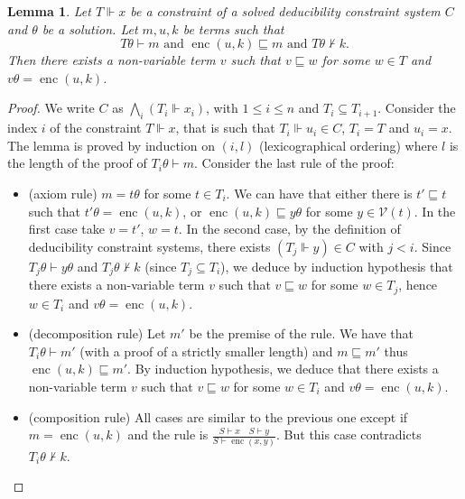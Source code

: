 \documentclass[acmtocl,acmnow]{acmtrans2m}
\newtheorem{lemma}[theorem]{Lemma}
\newcommand{\var}{\mathcal{V}}
\newcommand{\enc}{\operatorname{enc}}
\newcommand{\dedsys}[1]{deducibility constraint system}
\newcommand{\dedsyss}[1]{deducibility constraint systems}
\begin{document}
\begin{lemma}\label{lem:encrypts_deduc}
Let $T\Vdash x$ be a constraint of a solved \dedsys{} $C$ and $\theta$ be a
 solution. Let $m, u, k$ be terms such that
\[
T\theta\vdash m \mbox{ and } \enc(u,k)\sqsubseteq m \mbox{ and }
T\theta\not\vdash k. \]
Then there exists a non-variable term $v$ such that  $v\sqsubseteq w$ for some $w\in T$
and $v\theta = \enc(u,k)$.
\end{lemma}
\begin{proof}
We write $C$ as $\bigwedge_i(T_i\Vdash x_i)$, with $1\le i\le n$ and $T_i\subseteq T_{i+1}$.
Consider the index $i$ of the constraint $T\Vdash x$, that is such that $T_i\Vdash u_i\in C$, $T_i=T$ and
$u_i=x$. The lemma is proved by induction on $(i,l)$ (lexicographical ordering)
where $l$ is the length of the proof of $T_i\theta\vdash m$.
Consider the last rule of the proof:
\begin{itemize}
\item (axiom rule) $m = t\theta$ for some $t\in T_i$. We can have that either there is $t'\sqsubseteq t$ such
that $t'\theta=\enc(u,k)$, or $\enc(u,k)\sqsubseteq y\theta$ for some $y\in\var(t)$. In the first case
take $v=t'$, $w=t$. In the second case, by the definition of \dedsyss{},
there exists $(T_j\Vdash y)\in C$ with $j<i$. Since $T_j\theta\vdash
y\theta$ and $T_j\theta\not\vdash k$ (since $T_j\subseteq T_i$), we
deduce by induction hypothesis that there exists a non-variable term
$v$ such that $v\sqsubseteq w$ for some $w\in T_j$, hence $w\in T_i$ and $v\theta = \enc(u,k)$.
\item (decomposition rule) Let $m'$ be the premise of the rule. We have that $T_i\theta\vdash m'$ (with a
  proof of a strictly smaller length) and $m\sqsubseteq m'$
thus $\enc(u,k)\sqsubseteq m'$. By induction hypothesis, we deduce that there
exists a non-variable term $v$ such that  $v\sqsubseteq w$ for some $w\in T_i$ and $v\theta
= \enc(u,k)$.
\item (composition rule) All cases are similar to the previous one
  except if $m= \enc(u,k)$ and the rule is {\small
$\displaystyle\frac{S\vdash x\quad S\vdash y}{S\vdash \enc(x,y)}$}.
But this case contradicts $T_i\theta\not\vdash k$.
\end{itemize}
\end{proof}
\end{document}
